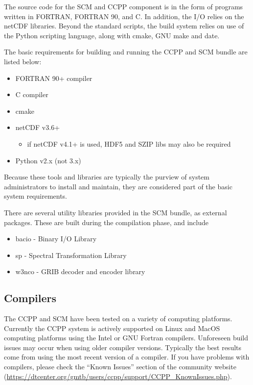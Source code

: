 The source code for the SCM and CCPP component is in the form of programs written in FORTRAN, FORTRAN 90, and C. In addition, the I/O relies on the netCDF libraries. Beyond the standard scripts, the build system relies on use of the Python scripting language, along with cmake, GNU make and date.

The basic requirements for building and running the CCPP and SCM bundle are listed below:
\begin{itemize}
    \item FORTRAN 90+ compiler
    \item C compiler
    \item cmake 
    \item netCDF v3.6+
        \begin{itemize}
    \item if netCDF v4.1+ is used, HDF5 and SZIP libs may also be required
\end{itemize}
    \item Python v2.x (not 3.x)
\end{itemize}

Because these tools and libraries are typically the purview of system administrators to install and maintain, they are considered  part of the basic system requirements.

There are several utility libraries provided in the SCM bundle, as external packages. These are built during the compilation phase, and include
\begin{itemize}
    \item bacio - Binary I/O Library
    \item sp - Spectral Transformation Library
    \item w3nco - GRIB decoder and encoder library
\end{itemize}

\subsection{Compilers}
The CCPP and SCM have been tested on a variety of
computing platforms. Currently the CCPP system is actively supported
on Linux and MacOS computing platforms using the Intel or GNU Fortran
compilers. Unforeseen build issues may occur when using older
compiler versions. Typically the best results come from using the
most recent version of a compiler. If you have problems with compilers, please check the ``Known Issues'' section of the
community website (\url{https://dtcenter.org/gmtb/users/ccpp/support/CCPP_KnownIssues.php}).

